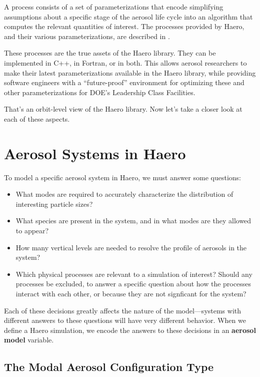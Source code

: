 A process consists of a set of parameterizations that encode simplifying
assumptions about a specific stage of the aerosol life cycle into an algorithm
that computes the relevant quantities of interest. The processes provided by
Haero, and their various parameterizations, are described in .

These processes are the true assets of the Haero library. They can be
implemented in C++, in Fortran, or in both. This allows aerosol researchers to
make their latest parameterizations available in the Haero library, while
providing software engineers with a ``future-proof'' environment for optimizing
these and other parameterizations for DOE's Leadership Class Facilities.

That's an orbit-level view of the Haero library. Now let's take a closer look at
each of these aspects.

\section{Aerosol Systems in Haero}

To model a specific aerosol system in Haero, we must answer some questions:

\begin{itemize}
  \item What modes are required to accurately characterize the distribution of
        interesting particle sizes?
  \item What species are present in the system, and in what modes are they
        allowed to appear?
  \item How many vertical levels are needed to resolve the profile of aerosols
        in the system?
  \item Which physical processes are relevant to a simulation of interest?
        Should any processes be excluded, to answer a specific question about
        how the processes interact with each other, or because they are not
        signficant for the system?
\end{itemize}

Each of these decisions greatly affects the nature of the model---systems with
different answers to these questions will have very different behavior. When we
define a Haero simulation, we encode the answers to these decisions in an
{\bf aerosol model} variable.

\subsection{The Modal Aerosol Configuration Type}

